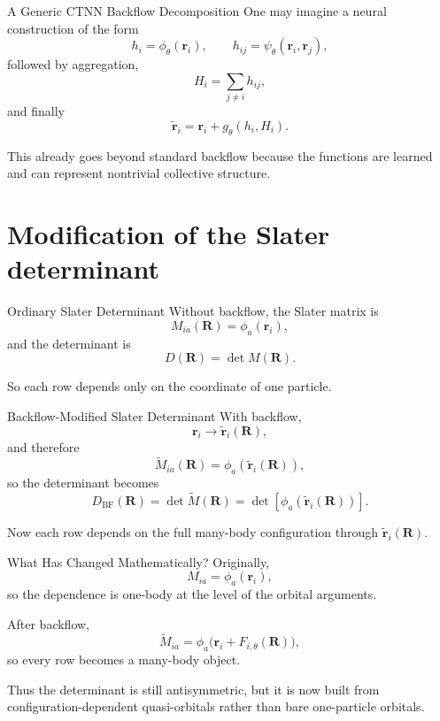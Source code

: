 \documentclass[aspectratio=169]{beamer}
\begin{document}
\begin{frame}{A Generic CTNN Backflow Decomposition}
One may imagine a neural construction of the form
\[
h_i = \phi_\theta(\mathbf{r}_i),\qquad
h_{ij}=\psi_\theta(\mathbf{r}_i,\mathbf{r}_j),
\]
followed by aggregation,
\[
H_i = \sum_{j\neq i} h_{ij},
\]
and finally
\[
\tilde{\mathbf{r}}_i = \mathbf{r}_i + g_\theta(h_i,H_i).
\]

This already goes beyond standard backflow because the functions are learned and can represent nontrivial collective structure.
\end{frame}

\section{Modification of the Slater determinant}

\begin{frame}{Ordinary Slater Determinant}
Without backflow, the Slater matrix is
\[
M_{ia}(\mathbf{R})=\phi_a(\mathbf{r}_i),
\]
and the determinant is
\[
D(\mathbf{R})=\det M(\mathbf{R}).
\]

So each row depends only on the coordinate of one particle.
\end{frame}

\begin{frame}{Backflow-Modified Slater Determinant}
With backflow,
\[
\mathbf{r}_i \to \tilde{\mathbf{r}}_i(\mathbf{R}),
\]
and therefore
\[
\widetilde{M}_{ia}(\mathbf{R})=\phi_a(\tilde{\mathbf{r}}_i(\mathbf{R})),
\]
so the determinant becomes
\[
D_{\mathrm{BF}}(\mathbf{R})
=
\det \widetilde{M}(\mathbf{R})
=
\det[\phi_a(\tilde{\mathbf{r}}_i(\mathbf{R}))].
\]

Now each row depends on the full many-body configuration through \(\tilde{\mathbf{r}}_i(\mathbf{R})\).
\end{frame}

\begin{frame}{What Has Changed Mathematically?}
Originally,
\[
M_{ia}=\phi_a(\mathbf{r}_i),
\]
so the dependence is one-body at the level of the orbital arguments.

After backflow,
\[
\widetilde{M}_{ia}
=
\phi_a\bigl(\mathbf{r}_i + F_{i,\theta}(\mathbf{R})\bigr),
\]
so every row becomes a many-body object.

Thus the determinant is still antisymmetric, but it is now built from configuration-dependent quasi-orbitals rather than bare one-particle orbitals.
\end{frame}
\end{document}
